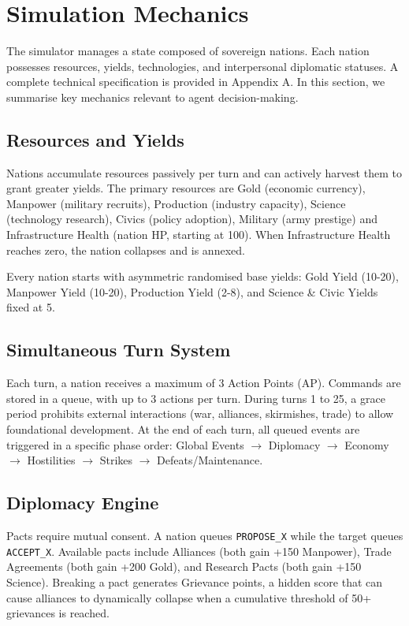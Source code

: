 \documentclass[11pt, a4paper, onecolumn]{article} %
\begin{document}
\section{Simulation Mechanics}

The simulator manages a state composed of sovereign nations. Each nation possesses resources, yields, technologies, and interpersonal diplomatic statuses. A complete technical specification is provided in Appendix A. In this section, we summarise key mechanics relevant to agent decision-making.

\subsection{Resources and Yields}

Nations accumulate resources passively per turn and can actively harvest them to grant greater yields. The primary resources are Gold (economic currency), Manpower (military recruits), Production (industry capacity), Science (technology research), Civics (policy adoption), Military (army prestige) and Infrastructure Health (nation HP, starting at 100). When Infrastructure Health reaches zero, the nation collapses and is annexed.

Every nation starts with asymmetric randomised base yields: Gold Yield (10-20), Manpower Yield (10-20), Production Yield (2-8), and Science \& Civic Yields fixed at 5.

\subsection{Simultaneous Turn System}

Each turn, a nation receives a maximum of 3 Action Points (AP). Commands are stored in a queue, with up to 3 actions per turn. During turns 1 to 25, a grace period prohibits external interactions (war, alliances, skirmishes, trade) to allow foundational development. At the end of each turn, all queued events are triggered in a specific phase order: Global Events $\rightarrow$ Diplomacy $\rightarrow$ Economy $\rightarrow$ Hostilities $\rightarrow$ Strikes $\rightarrow$ Defeats/Maintenance.

\subsection{Diplomacy Engine}

Pacts require mutual consent. A nation queues \texttt{PROPOSE\_X} while the target queues \texttt{ACCEPT\_X}. Available pacts include Alliances (both gain +150 Manpower), Trade Agreements (both gain +200 Gold), and Research Pacts (both gain +150 Science). Breaking a pact generates Grievance points, a hidden score that can cause alliances to dynamically collapse when a cumulative threshold of 50+ grievances is reached.
\end{document}
